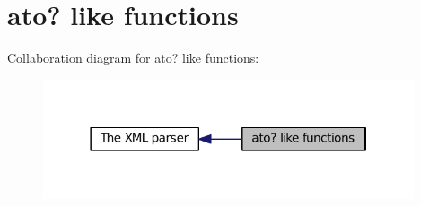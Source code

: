 \hypertarget{group__atoX}{\section{ato? like functions}
\label{group__atoX}
}
Collaboration diagram for ato? like functions\-:
\nopagebreak
\begin{figure}[H]
\begin{center}
\leavevmode
\includegraphics[width=310pt]{group__atoX}
\end{center}
\end{figure}
